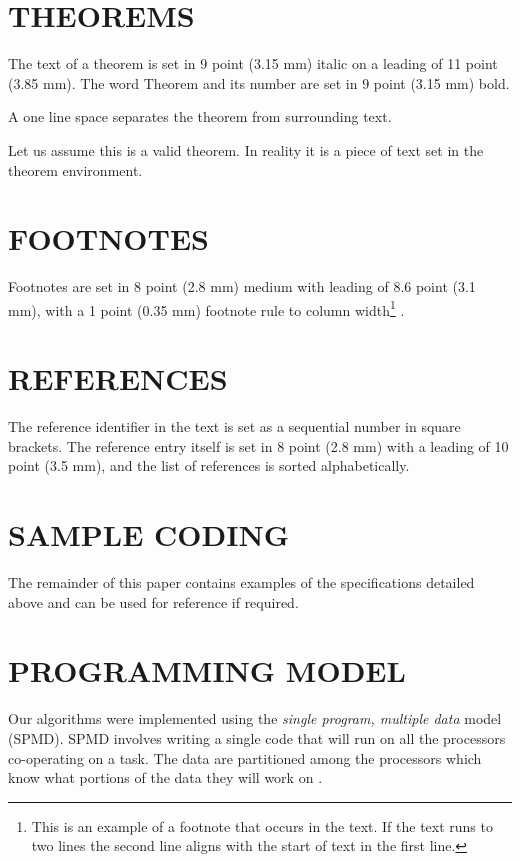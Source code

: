 \documentclass{ecai}
\begin{document}
\section{THEOREMS}
The text of a theorem is set in 9 point (3.15 mm) italic on a
leading of 11 point (3.85 mm). The word Theorem and its number
are set in 9 point (3.15 mm) bold.

A one line space separates the theorem from surrounding text.

\begin{theorem}
Let us assume this is a valid theorem. In reality it is a piece
of text set in the theorem environment.
\end{theorem}

\section{FOOTNOTES}
Footnotes are set in 8 point (2.8 mm) medium with leading of 8.6 point (3.1
mm), with a 1 point (0.35 mm) footnote rule to column
width\footnote{This is an example of a footnote that occurs in
the text. If the text runs to two lines the second line aligns
with the start of text in the first line.} .

\section{REFERENCES}
The reference identifier in the text is set as a sequential number in square brackets. The reference entry itself is set in 8 point (2.8 mm) with a leading of 10 point (3.5 mm), and the list of references is sorted alphabetically.

\section{SAMPLE CODING}
The remainder of this paper contains examples of the specifications
detailed above and can be used for reference if required.

\section{PROGRAMMING MODEL}
\label{par}
Our algorithms were implemented using the \emph{single program,
  multiple data} model (SPMD). SPMD involves writing a single code
that will run on all the processors co-operating on a task. The data
are partitioned among the processors which know what portions of the
data they will work on \cite{kn:Golub89}.
\end{document}
